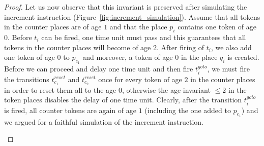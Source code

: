 \begin{proof}
Let us now observe
that this invariant is preserved after simulating the 
increment instruction (Figure~\ref{fig:increment_simulation}).
Assume that all tokens in the counter places are of age $1$ and that
the place $p_i$ contains one token of age $0$.
Before $t_i$ can be fired, one time unit must pass and this guarantees
that all tokens in the counter places will become of age $2$. After firing
of $t_i$, we also add one token of age $0$ to $p_{c_1}$ 
and moreover, a token of age $0$ in the place $q_i$ is created.
Before we can proceed and delay one time unit 
and then fire $t_i^{\mathit goto}$, we must fire the
transitions $t_{c_1}^{\mathit reset}$ and $t_{c_2}^{\mathit reset}$ once
for every token of age $2$ in the counter places in order to reset 
them all to the age $0$, otherwise the age invariant $\leq 2$ in the token 
places disables the delay of one time unit. Clearly, after the transition 
$t_i^{\mathit goto}$ is fired, all counter tokens are again of age $1$
(including the one added to $p_{c_1}$) and we argued for a faithful simulation
of the increment instruction.

\begin{figure}[h]
\centering
{}
\end{figure}
\end{proof}
